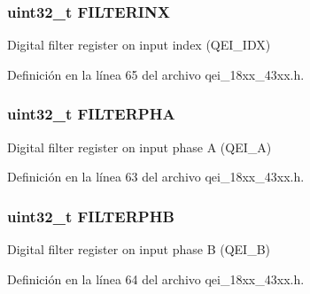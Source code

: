 \subsubsection[{\texorpdfstring{F\+I\+L\+T\+E\+R\+I\+NX}{FILTERINX}}]{ uint32\+\_\+t F\+I\+L\+T\+E\+R\+I\+NX}\hypertarget{struct_l_p_c___q_e_i___t_ad2d983a1db30704acc69ddc99cedbe86}{}\label{struct_l_p_c___q_e_i___t_ad2d983a1db30704acc69ddc99cedbe86}
Digital filter register on input index (Q\+E\+I\+\_\+\+I\+DX) 

Definición en la línea 65 del archivo qei\+\_\+18xx\+\_\+43xx.\+h.

\subsubsection[{\texorpdfstring{F\+I\+L\+T\+E\+R\+P\+HA}{FILTERPHA}}]{ uint32\+\_\+t F\+I\+L\+T\+E\+R\+P\+HA}\hypertarget{struct_l_p_c___q_e_i___t_a68dbaf829a58ba3db7534ae2a95b444f}{}\label{struct_l_p_c___q_e_i___t_a68dbaf829a58ba3db7534ae2a95b444f}
Digital filter register on input phase A (Q\+E\+I\+\_\+A) 

Definición en la línea 63 del archivo qei\+\_\+18xx\+\_\+43xx.\+h.

\subsubsection[{\texorpdfstring{F\+I\+L\+T\+E\+R\+P\+HB}{FILTERPHB}}]{ uint32\+\_\+t F\+I\+L\+T\+E\+R\+P\+HB}\hypertarget{struct_l_p_c___q_e_i___t_a261d421442a54ab4f01284609ceb9d65}{}\label{struct_l_p_c___q_e_i___t_a261d421442a54ab4f01284609ceb9d65}
Digital filter register on input phase B (Q\+E\+I\+\_\+B) 

Definición en la línea 64 del archivo qei\+\_\+18xx\+\_\+43xx.\+h.

